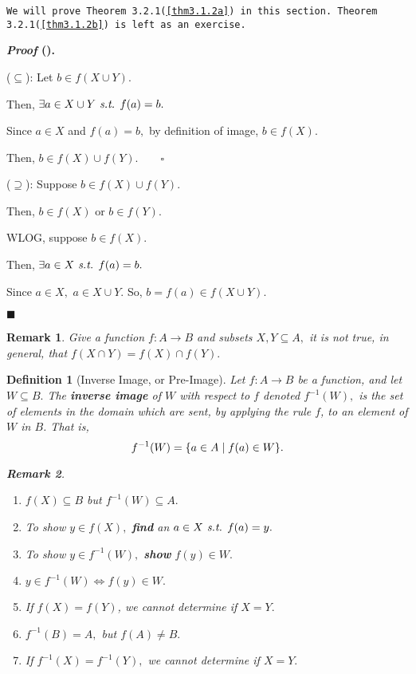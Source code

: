\documentclass[12pt,a4paper]{article}
\newtheorem{df}{Definition}[subsection]
\newcounter{nprf}[subsection]
\newtheorem*{rmk}{\indent Remark}
\newenvironment*{prf}{\par\indent\textbf{\textit{Proof} (\stepcounter{nprf}\thenprf). }\par }{\par\hfill $\blacksquare$\par}
\def\st{\emph{ s.t. }}
\begin{document}
\begin{framed}
\noindent\texttt{We will prove Theorem 3.2.1(\ref{thm3.1.2a}) in this section. Theorem 3.2.1(\ref{thm3.1.2b}) is left as an exercise. }
\begin{prf}
	($\subseteq$): Let $b\in f(X\cup Y).$\par\hspace{5mm} Then, $\exists a\in X\cup Y\st f(a)=b.$\par\hspace{5mm} Since $a\in X$ and $f(a)=b,$ by definition of image, $b\in f(X).$\par\hspace{5mm} Then, $b\in f(X)\cup f(Y).\qquad\square$\par 
	($\supseteq$): Suppose $b\in f(X)\cup f(Y).$\par\hspace{5mm} Then, $b\in f(X)$ or $b\in f(Y).$\par\hspace{5mm} WLOG, suppose $b\in f(X).$\par\hspace{5mm} Then, $\exists a\in X\st f(a)=b.$\par\hspace{5mm} Since $a\in X,$ $a\in X\cup Y.$ So, $b=f(a)\in f(X\cup Y).$
\end{prf}
\end{framed}
\begin{rmk}
	Give a function $f:A\to B$ and subsets $X,Y\subseteq A,$ it is not true, in general, that $f(X\cap Y)=f(X)\cap f(Y).$ 
\end{rmk}
\begin{df}[Inverse Image, or Pre-Image]
	Let $f:A\to B$ be a function, and let $W\subseteq B.$ The \textbf{inverse image} of $W$ with respect to $f$ denoted $f^{-1}(W),$ is the set of elements in the domain which are sent, by applying the rule $f$, to an element of $W$ in $B$. That is, \[f^{-1}(W)=\qty{a\in A\mid f(a)\in W}.\]
	\begin{rmk}
	\begin{enumerate}
		\item $f(X)\subseteq B$ but $f^{-1}(W)\subseteq A.$
		\item To show $y\in f(X),$ \textbf{find} an $a\in X\st f(a)=y.$
		\item To show $y\in f^{-1}(W),$ \textbf{show} $f(y)\in W.$
		\item $y\in f^{-1}(W)\iff f(y)\in W.$
		\item If $f(X)=f(Y)$, we cannot determine if $X=Y.$
		\item $f^{-1}(B)=A,$ but $f(A)\neq B.$
		\item If $f^{-1}(X)=f^{-1}(Y),$ we cannot determine if $X=Y.$
	\end{enumerate}
	\end{rmk}
\end{df}
\end{document}
